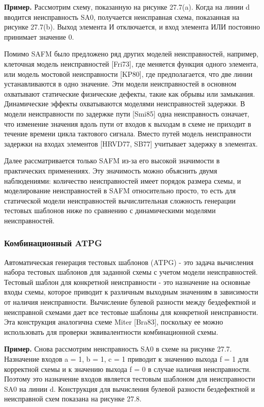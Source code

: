 \textbf{Пример.}
Рассмотрим схему, показанную на рисунке 27.7(a). Когда на линии d вводится неисправность SA0, получается неисправная схема, показанная на рисунке 27.7(b). Выход элемента И отключается, и вход элемента ИЛИ постоянно принимает значение 0.

Помимо SAFM было предложено ряд других моделей неисправностей, например, клеточная модель неисправностей [Fri73], где меняется функция одного элемента, или модель мостовой неисправности [KP80], где предполагается, что две линии устанавливаются в одно значение. Эти модели неисправностей в основном охватывают статические физические дефекты, такие как обрывы или замыкания. Динамические эффекты охватываются моделями неисправностей задержки. В модели неисправности по задержке пути [Smi85] одна неисправность означает, что изменение значения вдоль пути от входов к выходам в схеме не приходит в течение времени цикла тактового сигнала. Вместо путей модель неисправности задержки на входах элементов [HRVD77, SB77] учитывает задержку в элементах.

Далее рассматривается только SAFM из-за его высокой значимости в практических применениях. Эту значимость можно объяснить двумя наблюдениями: количество неисправностей имеет порядок размера схемы, и моделирование неисправностей в SAFM относительно просто, то есть для статической модели неисправностей вычислительная сложность генерации тестовых шаблонов ниже по сравнению с динамическими моделями неисправностей.

\subsubsection{Комбинационный ATPG}

Автоматическая генерация тестовых шаблонов (ATPG) - это задача вычисления набора тестовых шаблонов для заданной схемы с учетом модели неисправностей. Тестовый шаблон для конкретной неисправности - это назначение на основные входы схемы, которое приводит к различным выходным значениям в зависимости от наличия неисправности. Вычисление булевой разности между бездефектной и неисправной схемами дает все тестовые шаблоны для конкретной неисправности. Эта конструкция аналогична схеме Miter [Bra83], поскольку ее можно использовать для проверки эквивалентности комбинационной схемы.

\textbf{Пример.}
Снова рассмотрим неисправность SA0 в схеме на рисунке 27.7. Назначение входов a = 1, b = 1, c = 1 приводит к значению выхода f = 1 для корректной схемы и к значению выхода f = 0 в случае наличия неисправности. Поэтому это назначение входов является тестовым шаблоном для неисправности SA0 на линии d. Конструкция для вычисления булевой разности бездефектной и неисправной схем показана на рисунке 27.8.

